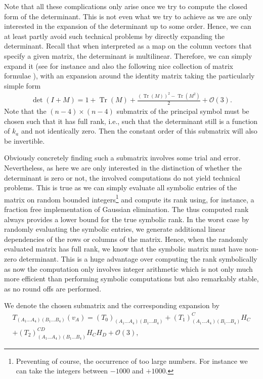 Note that all these complications only arise once we try to compute the closed form of the determinant. This is not even what we try to achieve as we are only interested in the expansion of the determinant up to some order. Hence, we can at least partly avoid such technical problems by directly expanding the determinant. Recall that when interpreted as a map on the column vectors that specify a given matrix, the determinant is multilinear. Therefore, we can simply expand it (see for instance \cite{2008CoTPh..49..801Z} and also the following nice collection of matrix formulae \cite{IMM2012-03274}), with an expansion around the identity matrix taking the particularly simple form
\begin{align}\label{detExp}
    \operatorname{det}(I+M) = 1 + \operatorname{Tr}(M) + \frac{(\operatorname{Tr}(M))^2- \operatorname{Tr}(M^2)}{2} + \mathcal{O}(3). 
\end{align}
Note that the $(n-4)\times (n-4)$ submatrix of the principal symbol must be chosen such that it has full rank, i.e., such that the determinant still is a function of $k_a$ and not identically zero. 
Then
the constant order of this submatrix will also be invertible.
\begin{remark}
Obviously concretely finding such a submatrix involves some trial and error. Nevertheless, as here we are only interested in the distinction of whether the determinant is zero or not, the involved computations do not yield technical problems. This is true as we can simply evaluate all symbolic entries of the matrix on random bounded integers\footnote{Preventing of course, the occurrence of too large numbers. For instance we can take the integers between $-1000$ and $+1000$.} and compute its rank using, for instance, a fraction free implementation of Gaussian elimination. The thus computed rank always provides a lower bound for the true symbolic rank. In the worst case by randomly evaluating the symbolic entries, we generate additional linear dependencies of the rows or columns of the matrix. Hence, when the randomly evaluated matrix has full rank, we know that the symbolic matrix must have non-zero determinant. This is a huge advantage over computing the rank symbolically as now the computation only involves integer arithmetic which is not only much more efficient than performing symbolic computations but also remarkably stable, as no round offs are performed.
\end{remark}
We denote the chosen submatrix and the corresponding expansion by
\begin{multline}
    T_{(A_1...A_4)(B_1...B_4)}(v_A) = (T_0)_{(A_1...A_4)(B_1...B_4)} + (T_1)_{(A_1...A_4)(B_1...B_4)}^{C} H_C \\
    +(T_2)_{(A_1...A_4)(B_1...B_4)}^{CD} H_C H_D + \mathcal{O}(3),
\end{multline}
